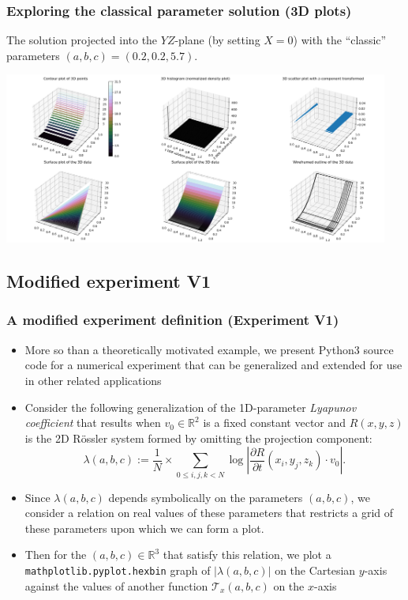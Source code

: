 \documentclass[usenames,svgnames,dvipsnames,10pt]{beamer}
\begin{document}
\begin{frame}[fragile]
\frametitle{Exploring the classical parameter solution (3D plots)}

The solution projected into the $YZ$-plane (by setting $X=0$) with the ``classic'' 
parameters $(a, b, c) = (0.2, 0.2, 5.7)$. \\ 
\begin{center}
\includegraphics[width=0.95\textwidth]{../Images/RosslerAttractorSummary-TypeYZ-Plot3D-A0-200B0-200C5-700-2021-10-27-045026.png}
\end{center}

\end{frame}

\subsection{Modified experiment V1}

\begin{frame}
\frametitle{A modified experiment definition (Experiment V1)}

\begin{itemize} 

\item More so than a theoretically motivated example, we present Python3 source code for a numerical experiment 
      that can be generalized and extended for use in other related applications 
\item Consider the following generalization of the 1D-parameter \emph{Lyapunov coefficient} that results when 
     $v_0 \in \mathbb{R}^2$ is a fixed constant vector and $R(x, y, z)$ is the 2D R\"ossler system formed by 
     omitting the projection component: \\ 
     \[
     \lambda(a, b, c) := \frac{1}{N} \times \sum_{0 \leq i, j, k < N} \log\left\lvert \frac{\partial R}{\partial t}(x_i, y_j, z_k) \cdot v_0 \right\rvert. 
     \]
\item Since $\lambda(a, b, c)$ depends symbolically on the parameters $(a, b, c)$, we consider a relation on real values 
      of these parameters that restricts a grid of these parameters upon which we can form a plot. 
\item Then for the $(a, b, c) \in \mathbb{R}^3$ that satisfy this relation, we plot a \texttt{mathplotlib.pyplot.hexbin} 
      graph of $|\lambda(a, b, c)|$ on the Cartesian $y$-axis against the values of another function $\mathcal{T}_x(a, b, c)$ on the 
      $x$-axis

\end{itemize} 

\end{frame}
\end{document}
